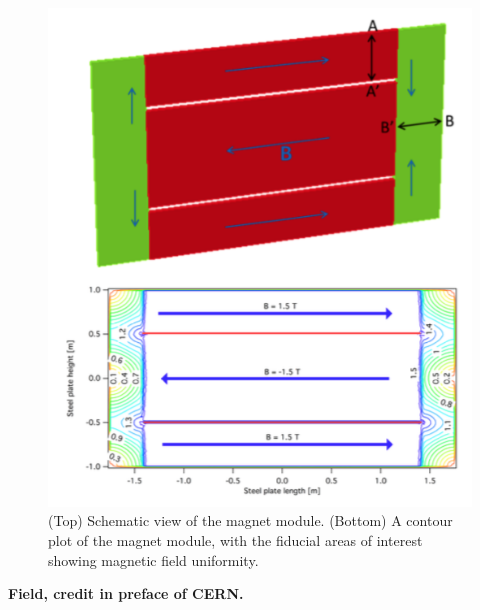 \begin{figure}[h!]
\centering
\includegraphics[width=\textwidth]{figures/Mfield.png}
\caption{(Top) Schematic view of the magnet module. (Bottom) A contour plot of the magnet module, with the fiducial areas of interest showing magnetic field uniformity.}
\label{fig:mField}
\end{figure}

\textbf{Field, credit in preface of CERN.}
